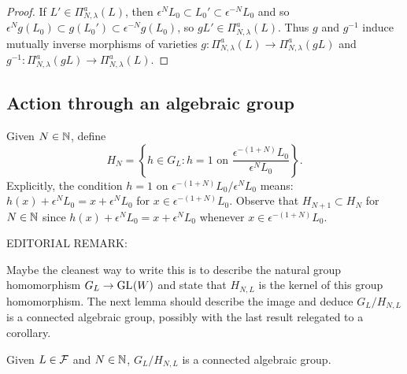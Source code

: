 \documentclass[a4paper, 11pt]{report}
\begin{document}
\begin{proof}
If $L'\in\Pi_{N,\lambda}^a(L)$, then $\epsilon^N L_0\subset L_0'\subset \epsilon^{-N}L_0$ and so $\epsilon^N g(L_0)\subset g(L_0')\subset \epsilon^{-N}g(L_0)$, so $gL'\in\Pi_{N,\lambda}^a(L)$. Thus $g$ and $g^{-1}$ induce mutually inverse morphisms of varieties $g\colon\Pi_{N,\lambda}^a(L)\to\Pi_{N,\lambda}^a(gL)$ and $g^{-1}\colon\Pi_{N,\lambda}^a(gL)\to\Pi_{N,\lambda}^a(L)$.
\end{proof}

\subsection{Action through an algebraic group}

Given $N\in\mathbb{N}$, define
\begin{equation*}
H_N = \left\{ h\in G_L: h=1 \text{ on } \frac{\epsilon^{-(1+N)}L_0}{\epsilon^N L_0} \right\}.
\end{equation*}
Explicitly, the condition $h=1$ on $\epsilon^{-(1+N)}L_0/{\epsilon^N L_0}$ means: $h(x) + \epsilon^N L_0 = x + \epsilon^N L_0$ for $x\in\epsilon^{-(1+N)}L_0$. Observe that $H_{N+1}\subset H_N$ for $N\in\mathbb{N}$ since $h(x) + \epsilon^N L_0 = x + \epsilon^N L_0$ whenever $x\in\epsilon^{-(1+N)}L_0$.

{\color{gray}
EDITORIAL REMARK:

Maybe the cleanest way to write this is to describe the natural group homomorphism $G_L\to \operatorname{GL}_{}(W)$ and state that $H_{N,L}$ is the kernel of this group homomorphism. The next lemma should describe the image and deduce $G_L/{H_{N,L}}$ is a connected algebraic group, possibly with the last result relegated to a corollary.
}

\begin{lemma}\label{lemma:connected-algebraic-group}
Given $L\in\mathcal{F}$ and $N\in\mathbb{N}$, $G_L/{H_{N,L}}$ is a connected algebraic group.
\end{lemma}
\end{document}
